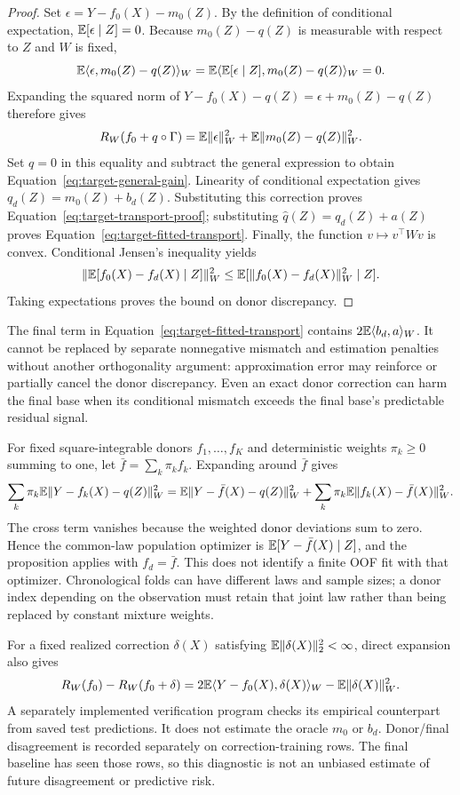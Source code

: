\begin{proof}
Set $\epsilon=Y-f_0(X)-m_0(Z)$. By the definition of conditional
expectation, $\mathbb{E}[\epsilon\mid Z]=0$. Because $m_0(Z)-q(Z)$ is
measurable with respect to $Z$ and $W$ is fixed,
\[
 \mathbb{E}\langle\epsilon,m_0(Z)-q(Z)\rangle_W
 =\mathbb{E}\langle\mathbb{E}[\epsilon\mid Z],m_0(Z)-q(Z)\rangle_W=0.
\]
Expanding the squared norm of
$Y-f_0(X)-q(Z)=\epsilon+m_0(Z)-q(Z)$ therefore gives
\[
 R_W(f_0+q\circ\Gamma)
 =\mathbb{E}\|\epsilon\|_W^2+\mathbb{E}\|m_0(Z)-q(Z)\|_W^2.
\]
Set $q=0$ in this equality and subtract the general expression to
obtain Equation~\eqref{eq:target-general-gain}. Linearity of conditional
expectation gives
$q_d(Z)=m_0(Z)+b_d(Z)$. Substituting this correction proves
Equation~\eqref{eq:target-transport-proof}; substituting
$\widehat q(Z)=q_d(Z)+a(Z)$ proves
Equation~\eqref{eq:target-fitted-transport}.
Finally, the function $v\mapsto v^\top Wv$ is convex. Conditional
Jensen's inequality yields
\[
 \|\mathbb{E}[f_0(X)-f_d(X)\mid Z]\|_W^2
 \leq\mathbb{E}[\|f_0(X)-f_d(X)\|_W^2\mid Z].
\]
Taking expectations proves the bound on donor discrepancy.
\end{proof}

The final term in Equation~\eqref{eq:target-fitted-transport} contains
$2\mathbb{E}\langle b_d,a\rangle_W$. It cannot be replaced by separate
nonnegative mismatch and estimation penalties without another
orthogonality argument: approximation error may reinforce or partially
cancel the donor discrepancy. Even an exact donor correction can harm
the final base when its conditional mismatch exceeds the final base's
predictable residual signal.

For fixed square-integrable donors $f_1,\ldots,f_K$ and deterministic weights
$\pi_k\geq0$ summing to one, let $\bar f=\sum_k\pi_k f_k$.
Expanding around $\bar f$ gives
\[
 \sum_k\pi_k\mathbb{E}\|Y-f_k(X)-q(Z)\|_W^2
 =\mathbb{E}\|Y-\bar f(X)-q(Z)\|_W^2
  +\sum_k\pi_k\mathbb{E}\|f_k(X)-\bar f(X)\|_W^2.
\]
The cross term vanishes because the weighted donor deviations sum to
zero. Hence the common-law population optimizer is
$\mathbb{E}[Y-\bar f(X)\mid Z]$, and the proposition applies with
$f_d=\bar f$. This does not identify a finite OOF fit with that
optimizer. Chronological folds can have different laws and sample
sizes; a donor index depending on the observation must retain that
joint law rather than being replaced by constant mixture weights.

For a fixed realized correction $\delta(X)$ satisfying
$\mathbb{E}\|\delta(X)\|_2^2<\infty$, direct expansion also gives
\begin{equation}
 R_W(f_0)-R_W(f_0+\delta)
 =2\mathbb{E}\langle Y-f_0(X),\delta(X)\rangle_W
  -\mathbb{E}\|\delta(X)\|_W^2.
 \label{eq:target-alignment-audit}
\end{equation}
A separately implemented verification program checks its empirical
counterpart from saved test predictions. It does not estimate the oracle $m_0$ or $b_d$.
Donor/final disagreement is recorded separately on correction-training
rows. The final baseline has seen those rows, so this diagnostic is not
an unbiased estimate of future disagreement or predictive risk.

